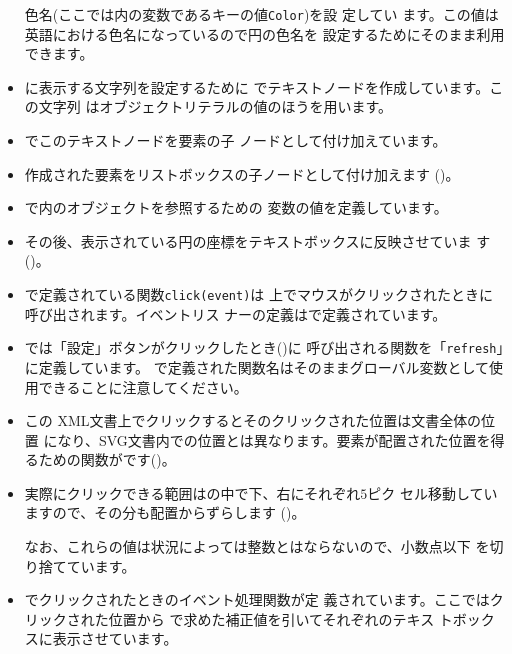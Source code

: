 \begin{itemize}
       色名(ここでは内の変数であるキーの値\texttt{Color})を設
       定してい ます。この値は英語における色名になっているので円の色名を
       設定するためにそのまま利用できます。
 \item {}に表示する文字列を設定するために
       でテキストノードを作成しています。この文字列
       はオブジェクトリテラルの値のほうを用います。
 \item {}でこのテキストノードを要素の子
       ノードとして付け加えています。
 \item 作成された要素をリストボックスの子ノードとして付け加えます
       ()。
 \item {}で\HTML 内のオブジェクトを参照するための
       変数の値を定義しています。
 \item その後、表示されている円の座標をテキストボックスに反映させていま
       す()。
  \item {}で定義されている関数\texttt{click(event)}は
       \SVG 上でマウスがクリックされたときに呼び出されます。イベントリス
       ナーの定義はで定義されています。
 \item {}では「設定」ボタンがクリックしたとき()に
       呼び出される関数を「\texttt{refresh}」に定義しています。
       で定義された関数名はそのままグローバル変数として使
       用できることに注意してください。
 \item この XML文書上でクリックするとそのクリックされた位置は文書全体の位置
       になり、SVG文書内での位置とは異なります。要素が配置された位置を得
       るための関数がです()。
 \item 実際にクリックできる範囲はの中で下、右にそれぞれ$5$ピク
			 セル移動していますので、その分も配置からずらします
			 ()。

			 なお、これらの値は状況によっては整数とはならないので、小数点以下
			 を切り捨てています。
 \item {}でクリックされたときのイベント処理関数が定
       義されています。ここではクリックされた位置から
       で求めた補正値を引いてそれぞれのテキス
       トボックスに表示させています。
\end{itemize}
